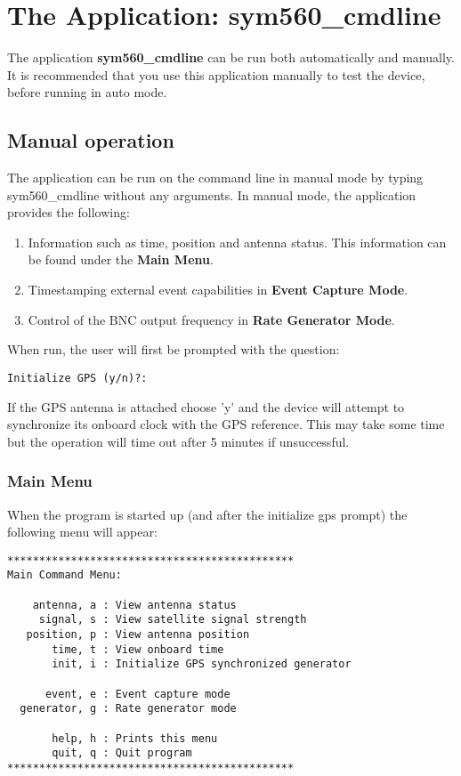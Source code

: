 \documentclass[11pt]{article}
\begin{document}



\section{The Application: sym560\_cmdline} \label{application}
The application \textbf{sym560\_cmdline} can be run both automatically and manually.  It is recommended that you use this application manually to test the device, before running in auto mode.

\subsection{Manual operation} \label{manualapp}
The application can be run on the command line in manual mode by typing sym560\_cmdline without any arguments.  In manual mode, the application provides the following:
\begin{enumerate}
 \item Information such as time, position and antenna status.  This information can be found under the \textbf{Main Menu}.
 \item Timestamping external event capabilities in \textbf{Event Capture Mode}.
 \item Control of the BNC output frequency in \textbf{Rate Generator Mode}.
\end{enumerate}

\noindent When run, the user will first be prompted with the question:
\begin{verbatim}
Initialize GPS (y/n)?:
\end{verbatim}
    If the GPS antenna is attached choose 'y' and the device will attempt to synchronize its onboard clock with the GPS reference.  This may take some time but the operation will time out after 5 minutes if unsuccessful.



\subsubsection{Main Menu} \label{mainmenu}
When the program is started up (and after the initialize gps prompt) the following menu will appear:
\begin{verbatim}
*********************************************
Main Command Menu:

    antenna, a : View antenna status
     signal, s : View satellite signal strength
   position, p : View antenna position
       time, t : View onboard time
       init, i : Initialize GPS synchronized generator

      event, e : Event capture mode
  generator, g : Rate generator mode

       help, h : Prints this menu
       quit, q : Quit program
*********************************************
\end{verbatim}
\end{document}
